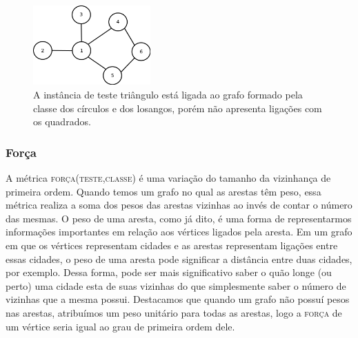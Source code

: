 
\begin{figure}[ht!]
\centering
\includegraphics[width=0.4\textwidth]{figures/vizinhos.png}
\caption{A instância de teste triângulo está ligada ao grafo formado pela classe dos círculos e dos losangos, porém não apresenta ligações com os quadrados.}
\label{fig::vizinhos}
\end{figure}

\subsubsection{Força}
\label{subsubsection::strength}

A métrica \textsc{força(teste,classe)} é uma variação do tamanho da vizinhança de primeira ordem. Quando temos um grafo no qual as arestas têm peso, essa métrica realiza a soma dos pesos das arestas vizinhas ao invés de contar o número das mesmas. O peso de uma aresta, como já dito, é uma forma de representarmos informações importantes em relação aos vértices ligados pela aresta. Em um grafo em que os vértices representam cidades e as arestas representam ligações entre essas cidades, o peso de uma aresta pode significar a distância entre duas cidades, por exemplo. Dessa forma, pode ser mais significativo saber o quão longe (ou perto) uma cidade esta de suas vizinhas do que simplesmente saber o número de vizinhas que a mesma possui.
Destacamos que quando um grafo não possuí pesos nas arestas, atribuímos um peso unitário para todas as arestas, logo a \textsc{força} de um vértice seria igual ao grau de primeira ordem dele.


